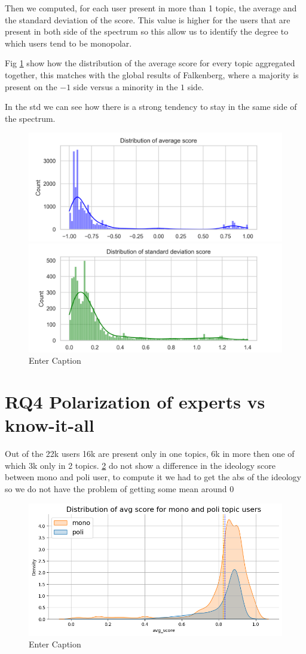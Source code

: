 Then we computed, for each user present in more than 1 topic, the average and the standard deviation of the score. This value is higher for the users that are present in both side of the spectrum so this allow us to identify the degree to which users tend to be monopolar.

Fig \ref{fig:std_avg} show how the distribution of the average score for every topic aggregated together, this matches with the global results of Falkenberg, where a majority is present on the $-1$ side versus a minority in the $1$ side.

In the std we can see how there is a strong tendency to stay in the same side of the spectrum.

\begin{figure}[H]
    \centering
    \includegraphics[width=0.9\linewidth]{Chapter5//figures/avg_score.png}
    
    \includegraphics[width=0.9\linewidth]{Chapter5//figures/std_score.png}
    \caption{Enter Caption}
    \label{fig:std_avg}
\end{figure}



\section{RQ4 Polarization of experts vs know-it-all }
Out of the 22k users 16k are present only in one topics, 6k in more then one of which 3k only in 2 topics. \ref{fig:monopoli} do not show a difference in the ideology score between mono and poli user, to compute it we had to get the abs of the ideology so we do not have the problem of getting some mean around 0 

\begin{figure}
    \centering
    \includegraphics[width=0.8\linewidth]{Chapter5//figures/monopoli_score.png}
    \caption{Enter Caption}
    \label{fig:monopoli}
\end{figure}

